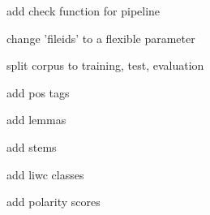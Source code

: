 
\begin{DoxyRefList}
\item[\label{todo__todo000001}%
\hypertarget{todo__todo000001}{}%
\-Class \hyperlink{classmodules_1_1pyuima_1_1Base_1_1Pipeline}{modules.pyuima.\-Base.\-Pipeline} ]add check function for pipeline 

change 'fileids' to a flexible parameter 

split corpus to training, test, evaluation  
\item[\label{todo__todo000003}%
\hypertarget{todo__todo000003}{}%
\-Class \hyperlink{classmodules_1_1pyuima_1_1CorpusAnnotators_1_1FrequentWords}{modules.pyuima.\-Corpus\-Annotators.\-Frequent\-Words} ]add pos tags 

add lemmas 

add stems 

add liwc classes 

add polarity scores 
\end{DoxyRefList}